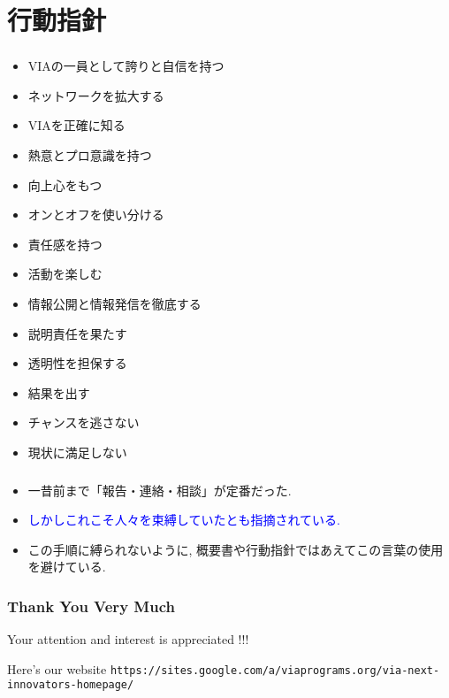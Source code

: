\documentclass[dvipdfmx,10pt]{beamer}
\newcommand{\bb}{\begin{block}}
\newcommand{\eb}{\end{block}}
\newcommand{\ft}{\frametitle}
\begin{document}
\section{行動指針}
\begin{frame}\ft{\insertsection}
\footnotesize
\begin{itemize}
\item VIAの一員として誇りと自信を持つ
\item ネットワークを拡大する
\item VIAを正確に知る
\item 熱意とプロ意識を持つ
\item 向上心をもつ
\item オンとオフを使い分ける
\item 責任感を持つ
\item 活動を楽しむ
\item 情報公開と情報発信を徹底する
\item 説明責任を果たす
\item 透明性を担保する
\item 結果を出す
\item チャンスを逃さない
\item 現状に満足しない
\end{itemize}
\normalsize
\end{frame}
\begin{frame}\ft{\insertsection}
\begin{itemize}
\item 一昔前まで「報告・連絡・相談」が定番だった.
\item \textcolor{blue}{しかしこれこそ人々を束縛していたとも指摘されている.}
\item この手順に縛られないように, 概要書や行動指針ではあえてこの言葉の使用を避けている.
\end{itemize}
\end{frame}
\begin{frame}\ft{Thank You Very Much}
Your attention and interest is appreciated !!!
\bb{Here's our website}
\footnotesize
\texttt{https://sites.google.com/a/viaprograms.org/via-next-innovators-homepage/}
\normalsize
\eb
\end{frame}
\end{document}
